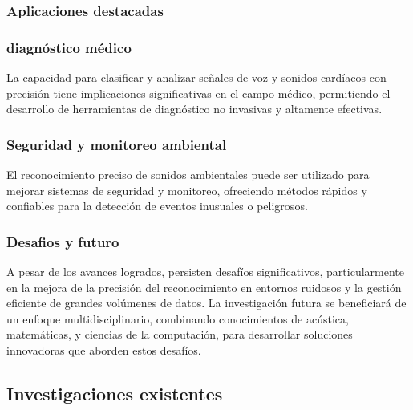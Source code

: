 \subsubsection*{Aplicaciones destacadas}
\subsubsection*{diagnóstico médico}
La capacidad para clasificar y analizar señales de voz y sonidos cardíacos con precisión tiene implicaciones significativas en el campo médico, permitiendo el desarrollo de herramientas de diagnóstico no invasivas y altamente efectivas.
\subsubsection*{Seguridad y monitoreo ambiental}
El reconocimiento preciso de sonidos ambientales puede ser utilizado para mejorar sistemas de seguridad y monitoreo, ofreciendo métodos rápidos y confiables para la detección de eventos inusuales o peligrosos.
\subsubsection*{Desafios y futuro}
A pesar de los avances logrados, persisten desafíos significativos, particularmente en la mejora de la precisión del reconocimiento en entornos ruidosos y la gestión eficiente de grandes volúmenes de datos. La investigación futura se beneficiará de un enfoque multidisciplinario, combinando conocimientos de acústica, matemáticas, y ciencias de la computación, para desarrollar soluciones innovadoras que aborden estos desafíos.
\subsection{Investigaciones existentes}
